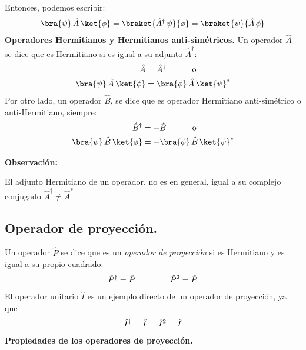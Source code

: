 Entonces, podemos escribir:
\begin{align}
\bra{\psi} \, \hat{A} \, \ket{\phi} = \braket{\hat{A}^{\dagger} \, \psi}{\phi} = \braket{\psi}{\hat{A} \, \phi}
\label{eq:ecuacion_02_69}
\end{align}
\textbf{Operadores Hermitianos y Hermitianos anti-simétricos.}
Un operador $\hat{A}$ se dice que es Hermitiano si es igual a su adjunto $\hat{A}^{\dagger}$:
\begin{align}
\begin{aligned}
\hat{A} &= \hat{A}^{\dagger}  \hspace{1cm} \mbox{ o } \\
\bra{\psi} \, \hat{A} \, \ket{\phi} &= \bra{\phi} \, \hat{A} \, \ket{\psi}^{*}
\end{aligned}
\label{eq:ecuacion_02_70}
\end{align}
Por otro lado, un operador $\hat{B}$, se dice que es operador Hermitiano anti-simétrico o anti-Hermitiano, siempre:
\begin{align}
\begin{aligned}
\hat{B}^{\dagger} &= - \hat{B}  \hspace{1cm} \mbox{ o } \\
\bra{\psi} \, \hat{B} \, \ket{\phi} &= - \bra{\phi} \, \hat{B} \, \ket{\psi}^{*}
\end{aligned}
\label{eq:ecuacion_02_71}
\end{align}

\textbf{Observación: }

El adjunto Hermitiano de un operador, no es en general, igual a su complejo conjugado $\hat{A}^{\dagger} \neq \hat{A}^{*}$

\subsection{Operador de proyección.}

Un operador $\hat{P}$ se dice que es un \emph{operador de proyección} si es Hermitiano y es igual a su propio cuadrado:
\begin{align}
\hat{P}^{\dagger} = \hat{P} \hspace{1.5cm} \hat{P}^{2} = \hat{P}
\label{eq:ecuacion_02_76}
\end{align}
El operador unitario $\hat{I}$ es un ejemplo directo de un operador de proyección, ya que 
\begin{align*}
\hat{I}^{\dagger} = \hat{I} \hspace{0.5cm} \hat{I}^{2} = \hat{I}
\end{align*}
\textbf{Propiedades de los operadores de proyección.}

